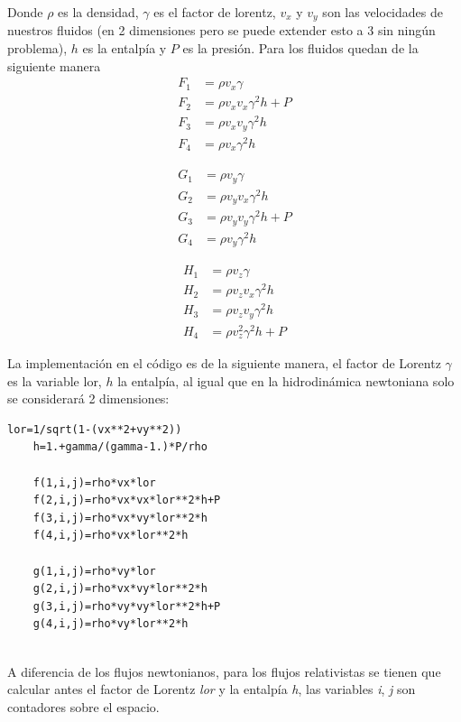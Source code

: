 \documentclass[12pt,a4paper]{book}
\begin{document}
Donde $\rho$ es la densidad, $\gamma$ es el factor de lorentz, $v_{x}$ y $v_{y}$ son las velocidades de nuestros fluidos (en 2 dimensiones pero se puede extender esto a 3 sin ningún problema), $h$ es la entalpía  y $P$ es la presión. Para los fluidos quedan de la siguiente manera
\begin{align}
F_{1}& = \rho v_{x} \gamma \\ 
F_{2}& = \rho v_{x} v_{x} \gamma^{2} h + P\\ 
F_{3}& = \rho v_{x} v_{y} \gamma^{2} h \\ 
F_{4}& = \rho v_{x} \gamma^{2} h 
\end{align}

\begin{align}
G_{1}& = \rho v_{y} \gamma \\ 
G_{2}& = \rho v_{y} v_{x} \gamma^{2} h \\ 
G_{3}& = \rho v_{y} v_{y} \gamma^{2} h + P\\ 
G_{4}& = \rho v_{y} \gamma^{2} h
\end{align}

\begin{align}
H_{1}& = \rho v_{z} \gamma \\ 
H_{2}& = \rho v_{z} v_{x} \gamma^{2} h \\ 
H_{3}& = \rho v_{z} v_{y} \gamma^{2} h \\ 
H_{4}& = \rho v_{z}^{2} \gamma^{2} h + P
\end{align}

La implementación en el código es de la siguiente manera, el factor de Lorentz $\gamma$ es la variable lor, $h$ la entalpía, al igual que en la hidrodinámica
newtoniana solo se considerará 2 dimensiones:

\begin{lstlisting}[frame=single]
    lor=1/sqrt(1-(vx**2+vy**2))
    h=1.+gamma/(gamma-1.)*P/rho
    
    f(1,i,j)=rho*vx*lor
    f(2,i,j)=rho*vx*vx*lor**2*h+P
    f(3,i,j)=rho*vx*vy*lor**2*h
    f(4,i,j)=rho*vx*lor**2*h

    g(1,i,j)=rho*vy*lor
    g(2,i,j)=rho*vx*vy*lor**2*h
    g(3,i,j)=rho*vy*vy*lor**2*h+P
    g(4,i,j)=rho*vy*lor**2*h


\end{lstlisting}


A diferencia de los flujos newtonianos, 
para los flujos relativistas se tienen que calcular antes el 
factor de Lorentz \emph{lor} y la entalpía \emph{h},
las variables \emph{i}, \emph{j} son contadores sobre el espacio.
\end{document}
